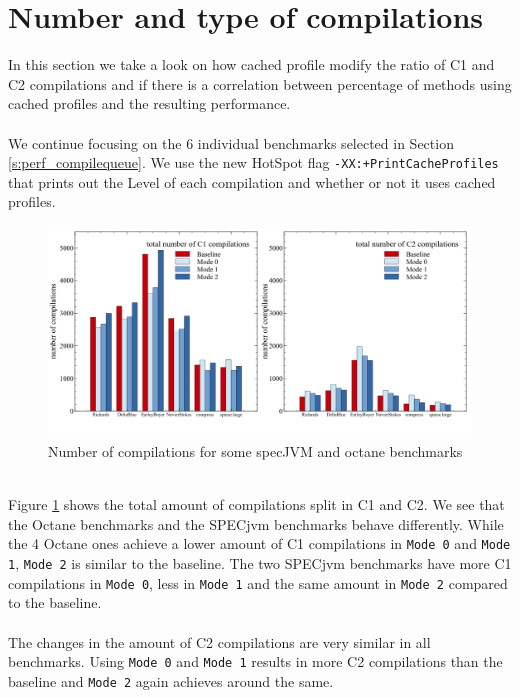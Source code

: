 \clearpage

\section{Number and type of compilations}
\label{s:perf_compilenumber}
In this section we take a look on how cached profile modify the ratio of C1 and C2 compilations and if there is a correlation between percentage of methods using cached profiles and the resulting performance.
\\\\
We continue focusing on the 6 individual benchmarks selected in Section \ref{s:perf_compilequeue}.
We use the new HotSpot flag \texttt{-XX:+PrintCacheProfiles} that prints out the Level of each compilation and whether or not it uses cached profiles.
\begin{figure}[ht!]
  \begin{center}
    \centering
    \includegraphics[width=1.0\textwidth]{figures/queue_total.png}
    \caption{Number of compilations for some specJVM and octane benchmarks}
    \label{f:queue_total}
  \end{center}
\end{figure}
\\
Figure \ref{f:queue_total} shows the total amount of compilations split in C1 and C2.
We see that the Octane benchmarks and the SPECjvm benchmarks behave differently. While the 4 Octane ones achieve a lower amount of C1 compilations in \texttt{Mode 0} and \texttt{Mode 1}, \texttt{Mode 2} is similar to the baseline. The two SPECjvm benchmarks have more C1 compilations in \texttt{Mode 0}, less in \texttt{Mode 1} and the same amount in \texttt{Mode 2} compared to the baseline.
\\\\
The changes in the amount of C2 compilations are very similar in all benchmarks. Using \texttt{Mode 0} and \texttt{Mode 1} results in more C2 compilations than the baseline and \texttt{Mode 2} again achieves around the same.

